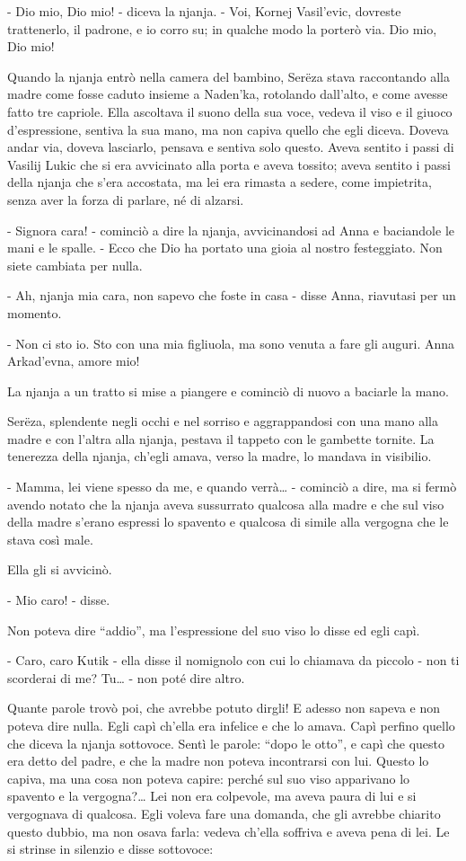 - Dio mio, Dio mio! - diceva la njanja. - Voi, Kornej Vasil'evic, dovreste trattenerlo, il padrone, e io corro su; in qualche modo la porterò via. Dio mio, Dio mio! 

Quando la njanja entrò nella camera del bambino, Serëza stava raccontando alla madre come fosse caduto insieme a Naden'ka, rotolando dall'alto, e come avesse fatto tre capriole. Ella ascoltava il suono della sua voce, vedeva il viso e il giuoco d'espressione, sentiva la sua mano, ma non capiva quello che egli diceva. Doveva andar via, doveva lasciarlo, pensava e sentiva solo questo. Aveva sentito i passi di Vasilij Lukic che si era avvicinato alla porta e aveva tossito; aveva sentito i passi della njanja che s'era accostata, ma lei era rimasta a sedere, come impietrita, senza aver la forza di parlare, né di alzarsi. 

- Signora cara! - cominciò a dire la njanja, avvicinandosi ad Anna e baciandole le mani e le spalle. - Ecco che Dio ha portato una gioia al nostro festeggiato. Non siete cambiata per nulla. 

- Ah, njanja mia cara, non sapevo che foste in casa - disse Anna, riavutasi per un momento. 

- Non ci sto io. Sto con una mia figliuola, ma sono venuta a fare gli auguri. Anna Arkad'evna, amore mio! 

La njanja a un tratto si mise a piangere e cominciò di nuovo a baciarle la mano. 

Serëza, splendente negli occhi e nel sorriso e aggrappandosi con una mano alla madre e con l'altra alla njanja, pestava il tappeto con le gambette tornite. La tenerezza della njanja, ch'egli amava, verso la madre, lo mandava in visibilio. 

- Mamma, lei viene spesso da me, e quando verrà\ldots{} - cominciò a dire, ma si fermò avendo notato che la njanja aveva sussurrato qualcosa alla madre e che sul viso della madre s'erano espressi lo spavento e qualcosa di simile alla vergogna che le stava così male. 

Ella gli si avvicinò. 

- Mio caro! - disse. 

Non poteva dire ``addio'', ma l'espressione del suo viso lo disse ed egli capì. 

- Caro, caro Kutik - ella disse il nomignolo con cui lo chiamava da piccolo - non ti scorderai di me? Tu\ldots{} - non poté dire altro. 

Quante parole trovò poi, che avrebbe potuto dirgli! E adesso non sapeva e non poteva dire nulla. Egli capì ch'ella era infelice e che lo amava. Capì perfino quello che diceva la njanja sottovoce. Sentì le parole: ``dopo le otto'', e capì che questo era detto del padre, e che la madre non poteva incontrarsi con lui. Questo lo capiva, ma una cosa non poteva capire: perché sul suo viso apparivano lo spavento e la vergogna?\ldots{} Lei non era colpevole, ma aveva paura di lui e si vergognava di qualcosa. Egli voleva fare una domanda, che gli avrebbe chiarito questo dubbio, ma non osava farla: vedeva ch'ella soffriva e aveva pena di lei. Le si strinse in silenzio e disse sottovoce: 


